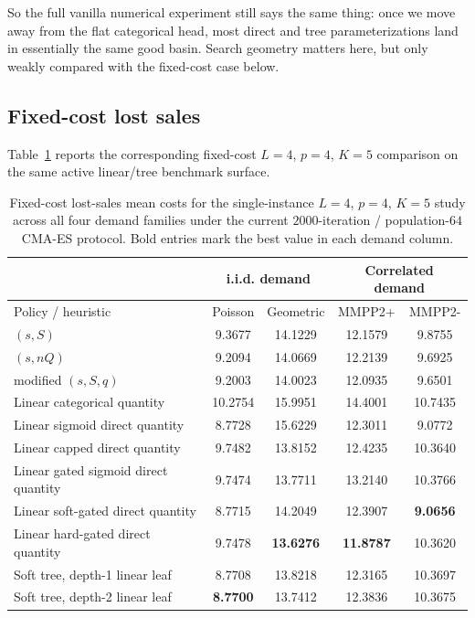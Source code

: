 \documentclass[11pt]{article}
\begin{document}
So the full vanilla numerical experiment still says the same thing: once we move away from the
flat categorical head, most direct and tree parameterizations land in essentially the same good
basin. Search geometry matters here, but only weakly compared with the fixed-cost case below.

\subsection{Fixed-cost lost sales}

Table~\ref{tab:fixed-cost-l4-demand-table} reports the corresponding fixed-cost $L=4$, $p=4$,
$K=5$ comparison on the same active linear/tree benchmark surface.

\begin{table}[t]
\centering
\small
\caption{Fixed-cost lost-sales mean costs for the single-instance $L=4$, $p=4$, $K=5$ study
across all four demand families under the current $2000$-iteration / population-$64$ CMA-ES
protocol. Bold entries mark the best value in each demand column.}
\label{tab:fixed-cost-l4-demand-table}
\begin{tabular}{|l||c|c||c|c|}
\hline
 & \multicolumn{2}{c||}{i.i.d. demand} & \multicolumn{2}{c|}{Correlated demand} \\
\hline
Policy / heuristic & Poisson & Geometric & MMPP2+ & MMPP2- \\
\hline
$(s,S)$ & 9.3677 & 14.1229 & 12.1579 & 9.8755 \\
$(s,nQ)$ & 9.2094 & 14.0669 & 12.2139 & 9.6925 \\
modified $(s,S,q)$ & 9.2003 & 14.0023 & 12.0935 & 9.6501 \\
\hline
Linear categorical quantity & 10.2754 & 15.9951 & 14.4001 & 10.7435 \\
Linear sigmoid direct quantity & 8.7728 & 15.6229 & 12.3011 & 9.0772 \\
Linear capped direct quantity & 9.7482 & 13.8152 & 12.4235 & 10.3640 \\
Linear gated sigmoid direct quantity & 9.7474 & 13.7711 & 13.2140 & 10.3766 \\
Linear soft-gated direct quantity & 8.7715 & 14.2049 & 12.3907 & \textbf{9.0656} \\
Linear hard-gated direct quantity & 9.7478 & \textbf{13.6276} & \textbf{11.8787} & 10.3620 \\
Soft tree, depth-1 linear leaf & 8.7708 & 13.8218 & 12.3165 & 10.3697 \\
Soft tree, depth-2 linear leaf & \textbf{8.7700} & 13.7412 & 12.3836 & 10.3675 \\
\hline
\end{tabular}
\end{table}
\end{document}
